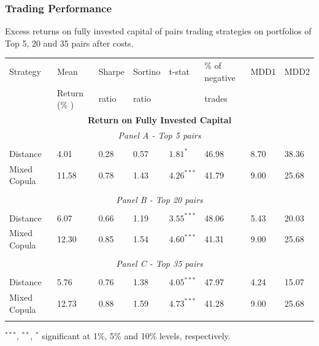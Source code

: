 \documentclass[pdf,10pt,xcolor=dvipsnames,hide notes]{beamer}
\begin{document}
\begin{frame}
	\frametitle{Trading Performance}
	\begin{threeparttable}[H]
		\centering \tiny
		\caption{Excess returns on fully invested capital of pairs trading strategies on portfolios of Top 5, 20 and 35 pairs after costs. }
		\begin{tabularx}{\textwidth}{@{\extracolsep{\fill}}llllllll@{}}
			\toprule
			Strategy & Mean  & Sharpe & Sortino & t-stat & \% of negative   & MDD1 & MDD2 \\
			& Return (\% ) & ratio &  ratio     &  &  trades     &       &  \\
			\midrule
			\multicolumn{8}{c}{\textbf{Return on Fully Invested Capital}} \\
			\multicolumn{8}{c}{\textit{Panel A - Top 5 pairs}} \\
			&       &       &       &       &       &       &  \\
			Distance & 4.01  & 0.28  & 0.57  & $1.81^{*}$  & 46.98 & 8.70    & 38.36  \\
			Mixed Copula & 11.58  & 0.78  & 1.43  & $4.26^{***}$  & 41.79 & 9.00  & 25.68 \\
			\multicolumn{1}{r}{} & \multicolumn{1}{r}{} & \multicolumn{1}{r}{} & \multicolumn{1}{r}{} & \multicolumn{1}{r}{} & \multicolumn{1}{r}{} & \multicolumn{1}{r}{} & \multicolumn{1}{r}{} \\
			\multicolumn{8}{c}{\textit{Panel B - Top 20 pairs}} \\
			&       &       &       &       &       &       &  \\
			Distance & 6.07  & 0.66  & 1.19  & $3.55^{***}$  & 48.06 & 5.43  & 20.03 \\
			Mixed Copula  & 12.30  & 0.85  & 1.54  & $4.60^{***}$  & 41.31 & 9.00  & 25.68  \\
			\multicolumn{1}{r}{} & \multicolumn{1}{r}{} & \multicolumn{1}{r}{} & \multicolumn{1}{r}{} & \multicolumn{1}{r}{} & \multicolumn{1}{r}{} & \multicolumn{1}{r}{} & \multicolumn{1}{r}{} \\
			\multicolumn{8}{c}{\textit{Panel C - Top 35 pairs}} \\
			&       &       &       &       &       &       &  \\
			Distance & 5.76  & 0.76  & 1.38  & $4.05^{***}$  & 47.97 & 4.24  & 15.07 \\
			Mixed Copula & 12.73  & 0.88  & 1.59  & $4.73^{***}$  & 41.28 & 9.00  & 25.68  \\
			\multicolumn{1}{r}{} & \multicolumn{1}{r}{} & \multicolumn{1}{r}{} & \multicolumn{1}{r}{} & \multicolumn{1}{r}{} & \multicolumn{1}{r}{} & \multicolumn{1}{r}{} & \multicolumn{1}{r}{} \\
			\bottomrule
		\end{tabularx}%
		\begin{tablenotes}
			\item \scriptsize $^{\ast\ast\ast}$, $^{\ast\ast}$, $^{\ast}$  significant at 1\%, 5\% and 10\% levels, respectively.
		\end{tablenotes}
		\label{tab:table103}%
	\end{threeparttable}%


\end{frame}
\end{document}
